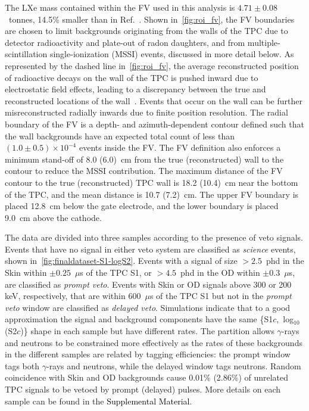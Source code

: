 The LXe mass contained within the FV used in this analysis is $4.71\pm0.08$~tonnes, 14.5\% smaller than in Ref.~\cite{LZ:SR3_WS2024}. 
Shown in~\autoref{fig:roi_fv}, the FV boundaries are chosen to limit backgrounds originating from the walls of the TPC due to detector radioactivity and plate-out of radon daughters, and from multiple-scintillation single-ionization (MSSI) events, discussed in more detail below.
As represented by the dashed line in~\autoref{fig:roi_fv}, the average reconstructed position of radioactive decays on the wall of the TPC is pushed inward due to electrostatic field effects, leading to a discrepancy between the true and reconstructed locations of the wall~\cite{LZ:SR1Backgrounds_2022, LZ:SR3_WS2024}. 
Events that occur on the wall can be further misreconstructed radially inwards due to finite position resolution. 
The radial boundary of the FV is a depth- and azimuth-dependent contour defined such that the wall backgrounds have an expected total count of less than $(1.0 \pm 0.5)\times10^{-4}$ events inside the FV.
The FV definition also enforces a minimum stand-off of 8.0 (6.0)~cm from the true (reconstructed) wall to the contour to reduce the MSSI contribution. 
The maximum distance of the FV contour to the true (reconstructed) TPC wall is 18.2 (10.4)~cm near the bottom of the TPC, and the mean distance is 10.7 (7.2)~cm.
The upper FV boundary is placed 12.8~cm below the gate electrode, and the lower boundary is placed 9.0~cm above the cathode.


The data are divided into three samples according to the presence of veto signals. 
Events that have no signal in either veto system are classified as \emph{science} events, shown in~\autoref{fig:finaldataset-S1-logS2}.
Events with a signal of size $> 2.5$~phd in the Skin within $\pm 0.25$~$\mu$s of the TPC S1, or $> 4.5$~phd in the OD within $\pm 0.3$~$\mu$s, are classified as \emph{prompt veto}. 
Events with Skin or OD signals above 300 or 200 keV, respectively, that are within $600$~$\mu$s of the TPC S1 but not in the \emph{prompt veto} window are classified  as \emph{delayed veto}.
Simulations indicate that to a good approximation the signal and background components have the same \{S1$c$,~log$_{10}$(S2$c$)\} shape in each sample but have different rates.
The partition allows $\gamma$-rays and neutrons to be constrained more effectively as the rates of these backgrounds in the different samples are related by tagging efficiencies: the prompt window tags both $\gamma$-rays and neutrons, while the delayed window tags neutrons. 
Random coincidence with Skin and OD backgrounds cause 0.01\% (2.86\%) of unrelated TPC signals to be vetoed by prompt (delayed) pulses. More details on each sample can be found in the \textcolor{black}{Supplemental Material}.



